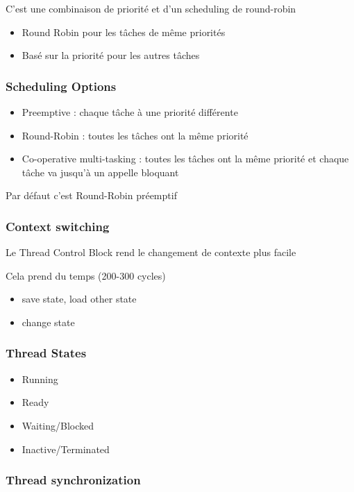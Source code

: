 \documentclass[resume]{subfiles}
\begin{document}
C'est une combinaison de priorité et d'un scheduling de round-robin
\begin{itemize}
\item Round Robin pour les tâches de même priorités
\item Basé sur la priorité pour les autres tâches
\end{itemize}

\subsubsection{Scheduling Options}
\begin{itemize}
\item Preemptive : chaque tâche à une priorité différente
\item Round-Robin : toutes les tâches ont la même priorité
\item Co-operative multi-tasking : toutes les tâches ont la même priorité et chaque tâche va jusqu'à un appelle bloquant
\end{itemize}

Par défaut c'est Round-Robin préemptif

\subsubsection{Context switching}

Le Thread Control Block rend le changement de contexte plus facile

Cela prend du temps (200-300 cycles)
\begin{itemize}
\item save state, load other state
\item change state
\end{itemize}

\subsubsection{Thread States}
\begin{itemize}
\item Running
\item Ready
\item Waiting/Blocked
\item Inactive/Terminated
\end{itemize}

\subsubsection{Thread synchronization}
\end{document}
